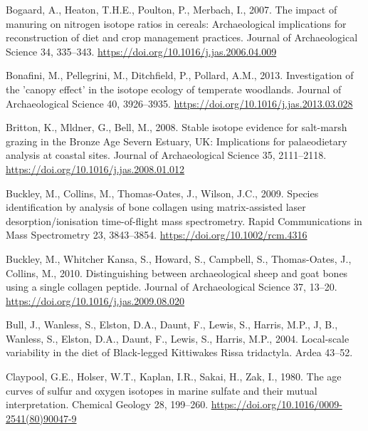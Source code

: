 \documentclass[preprint, 3p, authoryear]{elsarticle} %
\newlength{\cslhangindent}
\newlength{\cslentryspacingunit} %
\newenvironment{CSLReferences}[2] %
 {%
  \setlength{\parindent}{0pt}
  \ifodd #1
  \let\oldpar\par
  \def\par{\hangindent=\cslhangindent\oldpar}
  \fi
  \setlength{\parskip}{#2\cslentryspacingunit}
 }%
 {}
\begin{document}
\begin{CSLReferences}{1}{0}
\leavevmode{}%
Bogaard, A., Heaton, T.H.E., Poulton, P., Merbach, I., 2007. The impact of manuring on nitrogen isotope ratios in cereals: Archaeological implications for reconstruction of diet and crop management practices. Journal of Archaeological Science 34, 335--343. \url{https://doi.org/10.1016/j.jas.2006.04.009}

\leavevmode{}%
Bonafini, M., Pellegrini, M., Ditchfield, P., Pollard, A.M., 2013. Investigation of the 'canopy effect' in the isotope ecology of temperate woodlands. Journal of Archaeological Science 40, 3926--3935. \url{https://doi.org/10.1016/j.jas.2013.03.028}

\leavevmode{}%
Britton, K., Mldner, G., Bell, M., 2008. Stable isotope evidence for salt-marsh grazing in the {Bronze Age Severn Estuary}, {UK}: Implications for palaeodietary analysis at coastal sites. Journal of Archaeological Science 35, 2111--2118. \url{https://doi.org/10.1016/j.jas.2008.01.012}

\leavevmode{}%
Buckley, M., Collins, M., Thomas‐Oates, J., Wilson, J.C., 2009. Species identification by analysis of bone collagen using matrix-assisted laser desorption/ionisation time-of-flight mass spectrometry. Rapid Communications in Mass Spectrometry 23, 3843--3854. \url{https://doi.org/10.1002/rcm.4316}

\leavevmode{}%
Buckley, M., Whitcher Kansa, S., Howard, S., Campbell, S., Thomas-Oates, J., Collins, M., 2010. Distinguishing between archaeological sheep and goat bones using a single collagen peptide. Journal of Archaeological Science 37, 13--20. \url{https://doi.org/10.1016/j.jas.2009.08.020}

\leavevmode{}%
Bull, J., Wanless, S., Elston, D.A., Daunt, F., Lewis, S., Harris, M.P., J, B., Wanless, S., Elston, D.A., Daunt, F., Lewis, S., Harris, M.P., 2004. Local-scale variability in the diet of {Black}-legged {Kittiwakes Rissa} tridactyla. Ardea 43--52.

\leavevmode{}%
Claypool, G.E., Holser, W.T., Kaplan, I.R., Sakai, H., Zak, I., 1980. The age curves of sulfur and oxygen isotopes in marine sulfate and their mutual interpretation. Chemical Geology 28, 199--260. \url{https://doi.org/10.1016/0009-2541(80)90047-9}


\end{CSLReferences}
\end{document}
